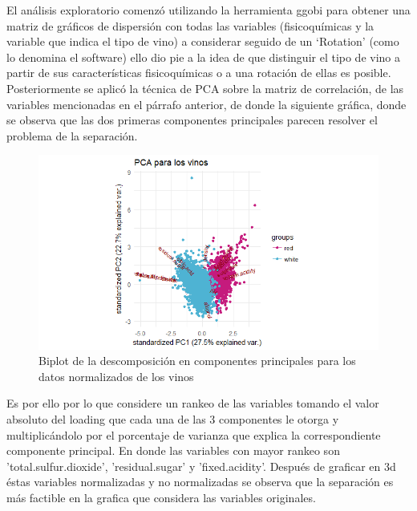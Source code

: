 \documentclass[paper=letter, fontsize=11pt]{scrartcl}
\numberwithin{equation}{section} %
\numberwithin{figure}{section} %
\numberwithin{table}{section} %
\begin{document}
El análisis exploratorio comenzó utilizando la herramienta ggobi para obtener una matriz de gráficos de dispersión con todas las variables (fisicoquímicas y la variable que indica el tipo de vino) a considerar seguido de un ‘Rotation’ (como lo denomina el software) ello dio pie a la idea de que distinguir el tipo de vino a partir de sus características fisicoquímicas o a una rotación de ellas es posible.
Posteriormente se aplicó la técnica de PCA sobre la matriz de correlación, de las variables mencionadas en el párrafo anterior, de donde la siguiente gráfica, donde se observa que las dos primeras componentes principales parecen resolver el problema de la separación.\\

\begin{figure}[htpb]
  \begin{center}
    \includegraphics[scale=.6]{pca_vinos2.png}
    \caption{Biplot de la descomposición en componentes principales para los datos normalizados de los vinos}
    \label{fig:pca_vinos}
  \end{center}
\end{figure}
Es por ello por lo que considere un rankeo de las variables tomando el valor absoluto del loading que cada una de las 3 componentes le otorga y multiplicándolo por el porcentaje de varianza que explica la correspondiente componente principal. En donde las variables con mayor rankeo son 'total.sulfur.dioxide', 'residual.sugar' y 'fixed.acidity'. Después de graficar en 3d éstas variables normalizadas y no normalizadas se observa que la separación es más factible en la grafica que considera las variables originales.\\
\end{document}
